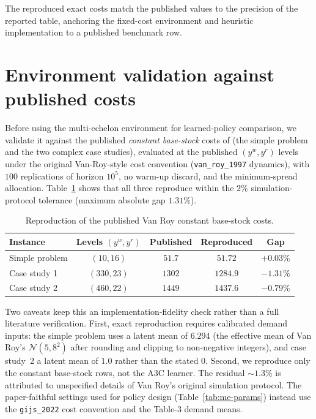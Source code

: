 \documentclass[11pt]{article}
\begin{document}
The reproduced exact costs match the published values to the precision of the reported table,
anchoring the fixed-cost environment and heuristic implementation to a published benchmark row.

\section{Environment validation against published costs}

Before using the multi-echelon environment for learned-policy comparison, we validate it against
the published \emph{constant base-stock} costs of \citet{vanroy1997ndp} (the simple problem and the
two complex case studies), evaluated at the published $(y^w,y^r)$ levels under the original
Van-Roy-style cost convention (\texttt{van\_roy\_1997} dynamics), with $100$ replications of horizon
$10^5$, no warm-up discard, and the minimum-spread allocation. Table~\ref{tab:me-validation} shows
that all three reproduce within the $2\%$ simulation-protocol tolerance (maximum absolute gap
$1.31\%$).

\begin{table}[!htbp]
\centering
\caption{Reproduction of the published Van Roy constant base-stock costs.}
\label{tab:me-validation}
\begin{tabular}{lcccc}
\toprule
Instance & Levels $(y^w,y^r)$ & Published & Reproduced & Gap \\
\midrule
Simple problem & $(10,16)$ & $51.7$ & $51.72$ & $+0.03\%$ \\
Case study 1 & $(330,23)$ & $1302$ & $1284.9$ & $-1.31\%$ \\
Case study 2 & $(460,22)$ & $1449$ & $1437.6$ & $-0.79\%$ \\
\bottomrule
\end{tabular}
\end{table}
\FloatBarrier

Two caveats keep this an implementation-fidelity check rather than a full literature verification.
First, exact reproduction requires calibrated demand inputs: the simple problem uses a latent mean
of $6.294$ (the effective mean of Van Roy's $\mathcal{N}(5,8^2)$ after rounding and clipping to
non-negative integers), and case study~2 a latent mean of $1.0$ rather than the stated $0$. Second,
we reproduce only the constant base-stock rows, not the A3C learner. The residual $\sim 1.3\%$ is
attributed to unspecified details of Van Roy's original simulation protocol. The paper-faithful
settings used for policy design (Table~\ref{tab:me-params}) instead use the \texttt{gijs\_2022} cost
convention and the Table-3 demand means.
\end{document}
